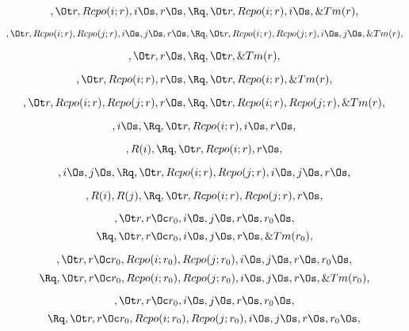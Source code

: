 \[, \Ot r, Rcpo(i;r), i \Os, r\Os, \Rq , \Ot r, Rcpo(i;r), i \Os, \&Tm(r), \]

\[, \Ot r, Rcpo(i;r), Rcpo(j;r), i \Os, j \Os, r\Os, \Rq , \Ot r, Rcpo(i;r), Rcpo(j;r), i \Os, j \Os, \&Tm(r), \]



\bigskip
\bigskip
\[, \Ot r, r\Os, \Rq , \Ot r, \&Tm(r), \]

\[, \Ot r, Rcpo(i;r), r\Os, \Rq , \Ot r, Rcpo(i;r), \&Tm(r), \]

\[, \Ot r, Rcpo(i;r), Rcpo(j;r), r\Os, \Rq , \Ot r, Rcpo(i;r), Rcpo(j;r), \&Tm(r), \]


\bigskip
\bigskip
\[, i \Os, \Rq , \Ot r, Rcpo(i;r), i \Os, r \Os, \]

\[, R(i), \Rq , \Ot r, Rcpo(i;r), r \Os, \]

\[, i \Os, j \Os, \Rq , \Ot r, Rcpo(i;r), Rcpo(j;r), i \Os, j \Os, r \Os, \]

\[, R(i), R(j), \Rq , \Ot r, Rcpo(i;r), Rcpo(j;r), r \Os, \]


\bigskip
\bigskip
\[, \Ot r, r \Oc r_0, i \Os, j \Os, r\Os, r_0 \Os, \]
\[\Rq , \Ot r, r \Oc r_0, i \Os, j \Os, r\Os, \&Tm(r_0), \]


\[, \Ot r, r \Oc r_0, Rcpo(i;r_0), Rcpo(j;r_0), i \Os, j \Os, r\Os, r_0 \Os, \]
\[\Rq , \Ot r, r \Oc r_0, Rcpo(i;r_0), Rcpo(j;r_0), i \Os, j \Os, r\Os, \&Tm(r_0), \]


\[, \Ot r, r \Oc r_0, i \Os, j \Os, r\Os, r_0 \Os, \]
\[\Rq , \Ot r, r \Oc r_0, Rcpo(i;r_0), Rcpo(j;r_0), i \Os, j \Os, r\Os, r_0 \Os, \]


\bigskip
\bigskip
